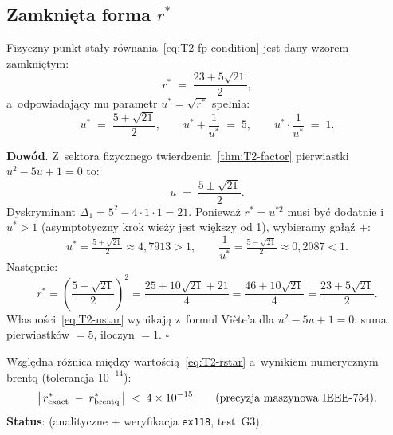 \subsection{Zamkni\k{e}ta forma $r^*$}\label{app:T2-closed-form}

\begin{theorem}\label{thm:T2-rstar}
Fizyczny punkt sta\l{}y r\'ownania~\eqref{eq:T2-fp-condition}
jest dany wzorem zamkni\k{e}tym:
\begin{equation}\label{eq:T2-rstar}
  r^* \;=\; \frac{23 + 5\sqrt{21}}{2},
\end{equation}
a~odpowiadaj\k{a}cy mu parametr $u^* = \sqrt{r^*}$ spe\l{}nia:
\begin{equation}\label{eq:T2-ustar}
  u^* \;=\; \frac{5 + \sqrt{21}}{2},
  \qquad
  u^* + \frac{1}{u^*} \;=\; 5,
  \qquad
  u^* \cdot \frac{1}{u^*} \;=\; 1.
\end{equation}

\textbf{Dow\'od}.
Z~sektora fizycznego twierdzenia~\ref{thm:T2-factor} pierwiastki
$u^2-5u+1=0$ to:
\[
  u \;=\; \frac{5 \pm \sqrt{21}}{2}.
\]
Dyskryminant $\Delta_1 = 5^2 - 4 \cdot 1 \cdot 1 = 21$.
Poniewa\.z $r^* = u^{*2}$ musi by\'c dodatnie i~$u^* > 1$ (asymptotyczny
krok wie\.zy jest wi\k{e}kszy od 1), wybieramy ga\l{}\k{a}\'z $+$:
\[
  u^* = \tfrac{5+\sqrt{21}}{2} \approx 4{,}7913 > 1,
  \qquad
  \frac{1}{u^*} = \tfrac{5-\sqrt{21}}{2} \approx 0{,}2087 < 1.
\]
Nast\k{e}pnie:
\[
  r^* = \left(\frac{5+\sqrt{21}}{2}\right)^{\!2}
      = \frac{25 + 10\sqrt{21} + 21}{4}
      = \frac{46 + 10\sqrt{21}}{4}
      = \frac{23 + 5\sqrt{21}}{2}.
\]
W\l{}asno\'sci~\eqref{eq:T2-ustar} wynikaj\k{a} z~formul
Viète'a dla $u^2-5u+1=0$:
suma pierwiastk\'ow $= 5$, iloczyn $= 1$.
\hfill$\square$
\end{theorem}

\begin{corollary}\label{cor:T2-precision}
Wzgl\k{e}dna ró\.znica mi\k{e}dzy warto\'sci\k{a}~\eqref{eq:T2-rstar}
a~wynikiem numerycznym brentq (tolerancja $10^{-14}$):
\begin{equation}
  \left|\,r^*_{\rm exact} \;-\; r^*_{\rm brentq}\,\right|
  \;<\; 4 \times 10^{-15}
  \qquad\text{(precyzja maszynowa IEEE-754)}.
\end{equation}
\textbf{Status}: 
(analityczne + weryfikacja \texttt{ex118}, test~G3).
\end{corollary}


